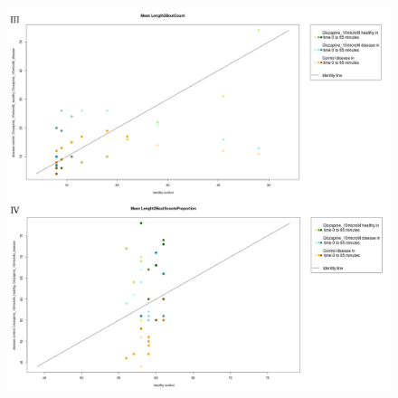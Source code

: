 \documentclass[a4paper,12pt]{article}
\begin{document}
\begin{figure}[h!]
\begin{center}
\includegraphics[width=15cm,height=16cm]{ApoHighCountScootsC.png}
\end{center}
\end{figure}
\newpage
\end{document}
